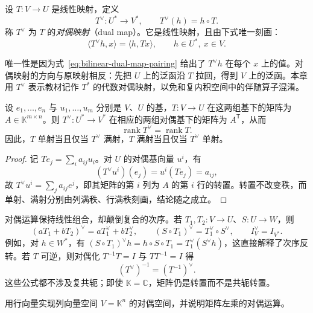 \begin{definition}
\label{def:bilinear-dual-map}
设 $T:V\to U$ 是线性映射，定义
\[
    T^\vee:U^*\longrightarrow V^*,\qquad T^\vee(h)=h\circ T.
\]
称 $T^\vee$ 为 $T$ 的\emph{对偶映射}（dual map）。它是线性映射，且由下式唯一刻画：
\begin{equation}
\label{eq:bilinear-dual-map-pairing}
    \langle T^\vee h,x\rangle=\langle h,Tx\rangle,
    \qquad h\in U^*,\ x\in V.
\end{equation}
\end{definition}

唯一性是因为式~\eqref{eq:bilinear-dual-map-pairing} 给出了 $T^\vee h$ 在每个 $x$ 上的值。对偶映射的方向与原映射相反：先把 $U$ 上的泛函沿 $T$ 拉回，得到 $V$ 上的泛函。本章用 $T^\vee$ 表示教材记作 $T^*$ 的代数对偶映射，以免和复内积空间中的伴随算子混淆。

\begin{theorem}
\label{thm:bilinear-dual-transpose}
设 $e_1,\ldots,e_n$ 与 $u_1,\ldots,u_m$ 分别是 $V$、$U$ 的基，$T:V\to U$ 在这两组基下的矩阵为 $A\in\mathbb K^{m\times n}$。则 $T^\vee:U^*\to V^*$ 在相应的两组对偶基下的矩阵为 $A^{\mathsf T}$，从而
\[
    \operatorname{rank}T^\vee=\operatorname{rank}T.
\]
因此，$T$ 单射当且仅当 $T^\vee$ 满射，$T$ 满射当且仅当 $T^\vee$ 单射。
\end{theorem}

\begin{proof}
记 $Te_j=\sum_i a_{ij}u_i$。对 $U$ 的对偶基向量 $u^i$，有
\[
    (T^\vee u^i)(e_j)=u^i(Te_j)=a_{ij},
\]
故 $T^\vee u^i=\sum_j a_{ij}e^j$，即其矩阵的第 $i$ 列为 $A$ 的第 $i$ 行的转置。转置不改变秩，而单射、满射分别由列满秩、行满秩刻画，结论随之成立。
\end{proof}

对偶运算保持线性组合，却颠倒复合的次序。若 $T_1,T_2:V\to U$、$S:U\to W$，则
\begin{equation}
\label{eq:bilinear-dual-rules}
    (aT_1+bT_2)^\vee=aT_1^\vee+bT_2^\vee,
    \qquad (S\circ T_1)^\vee=T_1^\vee\circ S^\vee,
    \qquad I_V^\vee=I_{V^*}.
\end{equation}
例如，对 $h\in W^*$，有 $(S\circ T_1)^\vee h=h\circ S\circ T_1=T_1^\vee(S^\vee h)$，这直接解释了次序反转。若 $T$ 可逆，则对偶化 $T^{-1}T=I$ 与 $TT^{-1}=I$ 得
\[
    (T^\vee)^{-1}=(T^{-1})^\vee.
\]
这些公式都不涉及复共轭；即使 $\mathbb K=\mathbb C$，矩阵仍是转置而不是共轭转置。

\begin{example}
\label{ex:bilinear-row-column-duality}
用行向量实现列向量空间 $V=\mathbb K^n$ 的对偶空间，并说明矩阵左乘的对偶运算。
\end{example}

